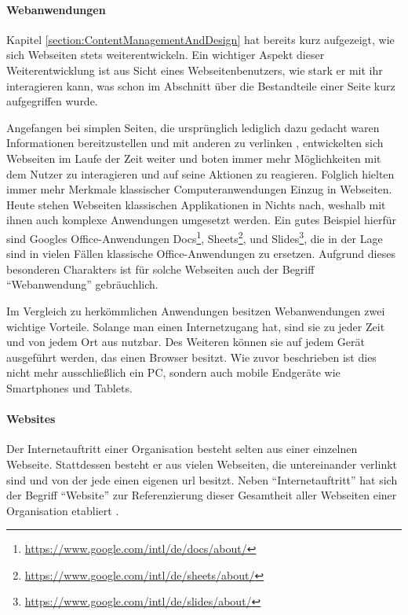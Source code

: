         \paragraph*{Webanwendungen}
        Kapitel \ref{section:ContentManagementAndDesign} hat bereits
        kurz aufgezeigt, wie sich Webseiten stets weiterentwickeln.
        Ein wichtiger Aspekt dieser Weiterentwicklung ist aus Sicht
        eines Webseitenbenutzers, wie stark er mit ihr interagieren kann,
        was schon im Abschnitt über die Bestandteile einer Seite kurz aufgegriffen wurde.

        Angefangen bei simplen Seiten,
        die ursprünglich lediglich dazu gedacht waren Informationen
        bereitzustellen und mit anderen zu
        verlinken \cite{bernersLee:InformationManagement},
        entwickelten sich Webseiten im Laufe der Zeit weiter
        und boten immer mehr Möglichkeiten mit dem Nutzer zu interagieren
        und auf seine Aktionen zu reagieren.
        Folglich hielten immer mehr Merkmale klassischer Computeranwendungen
        Einzug in Webseiten.
        Heute stehen Webseiten klassischen Applikationen in Nichts nach,
        weshalb mit ihnen auch komplexe Anwendungen umgesetzt werden.
        Ein gutes Beispiel hierfür sind Googles Office-Anwendungen
        Docs\footnote{\url{https://www.google.com/intl/de/docs/about/}},
        Sheets\footnote{\url{https://www.google.com/intl/de/sheets/about/}},
        und Slides\footnote{\url{https://www.google.com/intl/de/slides/about/}},
        die in der Lage sind in vielen Fällen klassische Office-Anwendungen zu ersetzen.
        Aufgrund dieses besonderen Charakters ist für solche Webseiten auch der Begriff
        "`Webanwendung"' gebräuchlich.

        Im Vergleich zu herkömmlichen Anwendungen besitzen Webanwendungen zwei wichtige Vorteile.
        Solange man einen Internetzugang hat, sind sie zu jeder Zeit und von jedem Ort aus nutzbar.
        Des Weiteren können sie auf jedem Gerät ausgeführt werden,
        das einen Browser besitzt. Wie zuvor beschrieben ist dies nicht mehr ausschließlich ein PC,
        sondern auch mobile Endgeräte wie Smartphones und Tablets.

        \paragraph*{Websites}
        Der Internetauftritt einer Organisation besteht selten aus einer
        einzelnen Webseite.
        Stattdessen besteht er aus vielen Webseiten,
        die untereinander verlinkt sind und von der jede einen eigenen
        \gls{url} besitzt.
        Neben "`Internetauftritt"' hat sich der Begriff "`Website"' zur
        Referenzierung dieser Gesamtheit aller Webseiten einer Organisation
        etabliert \cite{duden:Internetauftritt, oxford:Website}.


